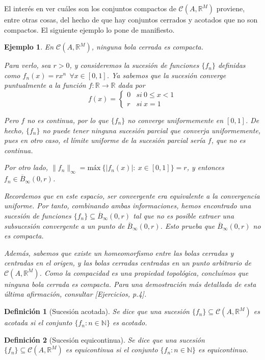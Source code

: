 \documentclass[11pt, a4paper]{article}
\newcommand{\fn}{\{f_n\}}
\theoremstyle{theorem-style}
\theoremstyle{definition-style}
\newtheorem{ndef}{Definición}[section]
\theoremstyle{remark-style}
\theoremstyle{example-style}
\newtheorem{ejemplo}{Ejemplo}[section]
\begin{document}
El interés en ver cuáles son los conjuntos compactos de $\mathcal{C}(A,\mathbb{R}^M)$ proviene, entre otras cosas, del hecho de que hay conjuntos cerrados y acotados que no son compactos. El siguiente ejemplo lo pone de manifiesto.

\begin{ejemplo} En $\mathcal{C}(A,\mathbb{R}^M)$, ninguna bola cerrada es compacta.

  Para verlo, sea $r>0$, y consideremos la sucesión de funciones $\fn$ definidas como $f_n(x) = rx^n \ \ \forall x \in [0,1]$. Ya sabemos que la sucesión converge puntualmente a la función $f: \mathbb{R} \to \mathbb{R}$ dada por $$f(x) = \begin{cases} 0 & si\ 0 \le x < 1\\ r & si\ x = 1 \end{cases}$$

  Pero $f$ no es continua, por lo que $\fn$ no converge uniformemente en $[0,1]$. De hecho, $\fn$ no puede tener ninguna sucesión parcial que converja uniformemente, pues en otro caso, el límite uniforme de la sucesión parcial sería $f$, que no es continua.

  Por otro lado, $\|f_n\|_{\infty} = \text{máx} \ \{ |f_n(x)|:\ x \in [0,1]\} = r$, y entonces $f_n \in \overline{B}_{\infty}(0,r)$. 

  Recordemos que en este espacio, ser convergente era equivalente a la convergencia uniforme. Por tanto, combinando ambas informaciones, hemos encontrado una sucesión de funciones $\fn \subseteq \overline{B}_{\infty}(0,r)$ tal que no es posible extraer una subsucesión convergente a un punto de $\overline{B}_{\infty}(0,r)$. Esto prueba que $\overline{B}_{\infty}(0,r)$ no es compacta.

  Además, sabemos que existe un homeomorfismo entre las bolas cerradas y centradas en el origen, y las bolas cerradas centradas en un punto arbitrario de $\mathcal{C}(A,\mathbb{R}^M)$. Como la compacidad es una propiedad topológica, concluímos que ninguna bola cerrada es compacta. Para una demostración más detallada de esta última afirmación, consultar \textit{[Ejercicios, p.4]}.
\end{ejemplo}

\begin{ndef}[Sucesión acotada]
  Se dice que una sucesión $\fn \subseteq \mathcal{C}(A,\mathbb{R}^M)$ es acotada si el conjunto $\{ f_n: n \in \mathbb{N}\}$ es acotado. 
\end{ndef}

\begin{ndef}[Sucesión equicontinua]
  Se dice que una sucesión $\fn \subseteq \mathcal{C}(A,\mathbb{R}^M)$ es equicontinua si el conjunto $\{ f_n: n \in \mathbb{N}\}$ es equicontinuo. 
\end{ndef}
\end{document}
